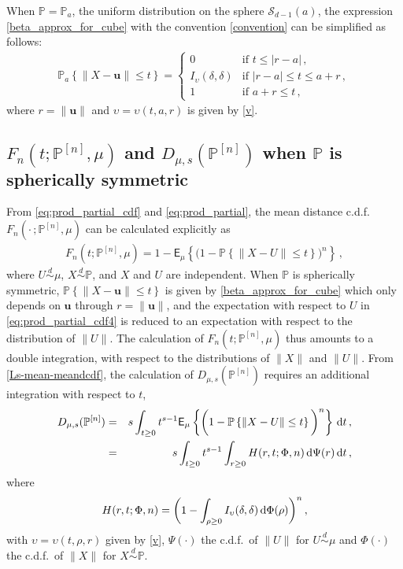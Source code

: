\documentclass{article}
\def\Ex{\mathsf{E}}
\def\simd{\stackrel{d}{\sim}}
\def\PP{\mathbb{P}}
\def\SS{{\mathcal S}}
\newcommand{\bea}{\begin{eqnarray*}}
\newcommand{\eea}{\end{eqnarray*}}
\newcommand{\be}{\begin{eqnarray}}
\newcommand{\ee}{\end{eqnarray}}
\def\ub{\mathbf{u}}
\def\dd{\mbox{\rm d}}
\begin{document}
When $\PP=\PP_a$, the uniform distribution on the sphere $\SS_{d-1}(a)$, the expression \eqref{beta_approx_for_cube} with the convention \eqref{convention} can be simplified as follows:
\be\label{PPaa}
\PP_a\left\{ \| X-\ub \| \leq t \right\} =
\left\{\begin{array}{ll}
0                      & \mbox{if } t\leq |r-a| \,,\\
I_\upsilon(\delta,\delta) & \mbox{if } |r-a| \leq t \leq a+r \,, \\
1                      & \mbox{if } a+r \leq t \,,
\end{array} \right.
\ee
where $r=\|\ub\|$ and $\upsilon=\upsilon(t,a,r)$ is given by \eqref{v}.

\subsection{$F_n(t; \PP^{[n]},\mu)$ and $D_{\mu,s}(\PP^{[n]})$ when $\PP$ is spherically symmetric}\label{S:F-distribution-d2-Xspherical}

From \eqref{eq:prod_partial_cdf} and \eqref{eq:prod_partial}, the mean distance c.d.f.\ $F_n(\cdot\,; \PP^{[n]},\mu)$ can be calculated explicitly as
\be \label{eq:prod_partial_cdf4}
F_n(t; \PP^{[n]},\mu) = 1- \Ex_\mu \left\{ \bigg(1-\PP \left\{ \| X-U \| \leq t \right\} \bigg)^n \right\}\,,
\ee
where $U\simd \mu$, $X \simd \PP$, and $X$ and $U$ are independent.
When $\PP$ is spherically symmetric, $\PP \left\{ \|X- \ub \| \leq t \right\} $ is given by \eqref{beta_approx_for_cube} which only depends on $\ub$ through $r=\|\ub\|$, and the expectation with respect to $U$ in \eqref{eq:prod_partial_cdf4} is reduced to an expectation with respect to the distribution of $\|U\|$. The calculation of $F_n(t; \PP^{[n]},\mu)$ thus amounts to a double integration, with respect to the distributions of $\|X\|$ and $\|U\|$.
From \eqref{Ls-mean-meandcdf}, the calculation of $D_{\mu,s}(\PP^{[n]})$ requires an additional integration with respect to $t$,
\be
D_{\mu,s}(\PP^{[n]}) &=&  s \int_{t\geq 0} t^{s-1} \Ex_\mu \left\{ \bigg(1-\PP \left\{ \| X-U \| \leq t \right\} \bigg)^n \right\} \,\dd t \,, \nonumber \\
&=& s \int_{t\geq 0} t^{s-1} \int_{r\geq 0} H(r,t;\Phi,n)\, \dd\Psi(r)\,\dd t \,, \label{Ls-mean-final}
\ee
where
\bea %
H(r,t;\Phi,n) =\bigg(1-\int_{\rho\geq 0} I_\upsilon(\delta,\delta) \,\dd\Phi(\rho ) \bigg)^n \,,
\eea
with $\upsilon=\upsilon(t,\rho,r)$ given by \eqref{v}, $\Psi(\cdot)$ the c.d.f.\ of $\|U\|$ for $U\simd\mu$ and $\Phi(\cdot)$ the c.d.f.\ of $\|X\|$ for $X\simd\PP$.
\end{document}
